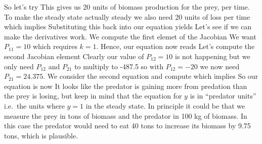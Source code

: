 So let's try
This gives us 20 units of biomass production for the prey, per time. To make the steady state actually steady we also need 20 units of loss per time 
which implies 
Substituting this back into our equation yields 
Let's see if we can make the derivatives work. We compute the first elemet of the Jacobian 
We want $P_{11}=10$ which requires $k=1$. Hence, our equation now  reads 
Let's compute the second Jacobian element 
Clearly our value of $P_{12}=10$ is not happening but we only need $P_{12}$ and $P_{21}$ to multiply to -487.5 so with $P_{12}=-20$ we now need $P_{21}= 24.375$. We consider the second equation 
and compute 
which implies 
So our equation is now 
It looks like the predator is gaining more from predation than the prey is losing, but keep in mind that the equation for $y$ is in ``predator units'' i.e.~the units where $y=1$ in the steady state. In principle it could be that we measure the prey in tons of biomass and the predator in 100 kg of biomass. In this case the predator would need to eat 40 tons to increase its biomass by 9.75 tons, which is plausible.

